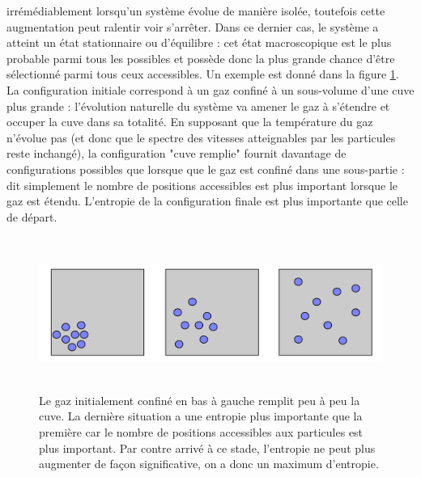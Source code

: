  irrémédiablement lorsqu'un système évolue de manière isolée, toutefois cette augmentation peut ralentir voir s'arrêter. Dans ce dernier cas, le système a atteint un état stationnaire ou d'équilibre : cet état macroscopique est le plus probable parmi tous les possibles et possède donc la plus grande chance d'être sélectionné parmi tous ceux accessibles. Un exemple est donné dans la figure \ref{f:equi}. La configuration initiale correspond à un gaz confiné à un sous-volume d'une cuve plus grande : l'évolution naturelle du système va amener le gaz à s'étendre et occuper la cuve dans sa totalité. En supposant que la température du gaz n'évolue pas (et donc que le spectre des vitesses atteignables par les particules reste inchangé), la configuration "cuve remplie" fournit davantage de configurations possibles que lorsque que le gaz est confiné dans une sous-partie : dit simplement le nombre de positions accessibles est plus important lorsque le gaz est étendu. L'entropie de la configuration finale est plus importante que celle de départ. 
\begin{figure}[htbp]
	\centering
		\includegraphics[height=5cm]{figs/equiconfig.png}
\caption[Remplissage d'une cuve par un gaz]{Le gaz initialement confiné en bas à gauche remplit peu à peu la cuve. La dernière situation a une entropie plus importante que la première car le nombre de positions accessibles aux particules est plus important. Par contre arrivé à ce stade, l'entropie ne peut plus augmenter de façon significative, on a donc un maximum d'entropie.}
	\label{f:equi}
\end{figure}

